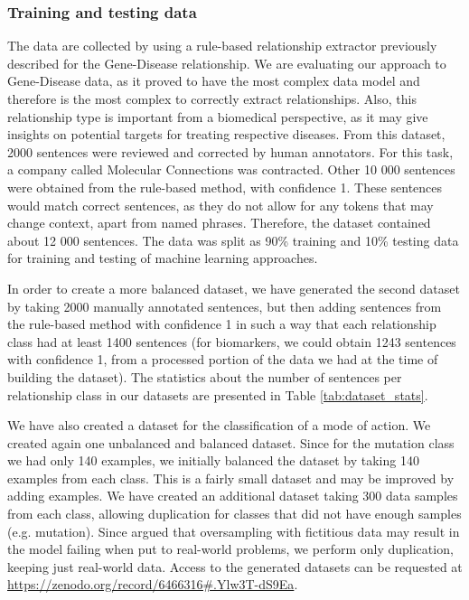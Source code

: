 \documentclass[final,12pt,3p,times,twocolumn,authoryear]{elsarticle}
\begin{document}
\subsubsection{Training and testing data}

The data are collected by using a rule-based relationship extractor previously described for the Gene-Disease relationship. We are evaluating our approach to Gene-Disease data, as it proved to have the most complex data model and therefore is the most complex to correctly extract relationships. Also, this relationship type is important from a biomedical perspective, as it may give insights on potential targets for treating respective diseases. From this dataset, 2000 sentences were reviewed and corrected by human annotators. For this task, a company called Molecular Connections was contracted. Other 10 000 sentences were obtained from the rule-based method, with confidence 1. These sentences would match correct sentences, as they do not allow for any tokens that may change context, apart from named phrases. Therefore, the dataset contained about 12 000 sentences. The data was split as 90\% training and 10\% testing data for training and testing of machine learning approaches. 



In order to create a more balanced dataset, we have generated the second dataset by taking 2000 manually annotated sentences, but then adding sentences from the rule-based method with confidence 1 in such a way that each relationship class had at least 1400 sentences (for biomarkers, we could obtain 1243 sentences with confidence 1, from a processed portion of the data we had at the time of building the dataset). The statistics about the number of sentences per relationship class in our datasets are presented in Table \ref{tab:dataset_stats}.



We have also created a dataset for the classification of a mode of action. We created again one unbalanced and balanced dataset. Since for the mutation class we had only 140 examples, we initially balanced the dataset by taking 140 examples from each class. This is a fairly small dataset and may be improved by adding examples. We have created an additional dataset taking 300 data samples from each class, allowing duplication for classes that did not have enough samples (e.g. mutation). Since \cite{tarawneh2022stop} argued that oversampling with fictitious data may result in the model failing when put to real-world problems, we perform only duplication, keeping just real-world data.  Access to the generated datasets can be requested at \url{https://zenodo.org/record/6466316#.Ylw3T-dS9Ea}.
\end{document}
